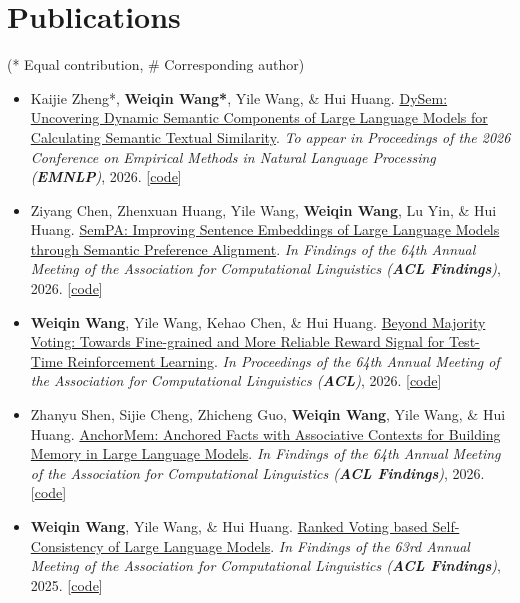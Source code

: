 \documentclass[a4paper,11pt]{article}
\newcommand{\resumeItemListStart}{\begin{itemize}[leftmargin=*,labelsep=1mm,itemsep=0.5mm]}
\newcommand{\resumeItemListEnd}{\end{itemize}\vspace{-2mm}}
\begin{document}
\section{\textbf{Publications}}
\vspace{-0.4mm}
\small{(* Equal contribution, \# Corresponding author)}
\vspace{0.5mm}
\resumeItemListStart
  \item Kaijie Zheng*, \textbf{Weiqin Wang*}, Yile Wang, \& Hui Huang. \href{https://arxiv.org/abs/2605.29751}{DySem: Uncovering Dynamic Semantic Components of Large Language Models for Calculating Semantic Textual Similarity}. \textit{To appear in Proceedings of the 2026 Conference on Empirical Methods in Natural Language Processing (\textbf{EMNLP})}, 2026. [\href{https://github.com/szu-tera/DySem}{code}]
  \item Ziyang Chen, Zhenxuan Huang, Yile Wang, \textbf{Weiqin Wang}, Lu Yin, \& Hui Huang. \href{https://aclanthology.org/2026.findings-acl.1858.pdf}{SemPA: Improving Sentence Embeddings of Large Language Models through Semantic Preference Alignment}. \textit{In Findings of the 64th Annual Meeting of the Association for Computational Linguistics (\textbf{ACL Findings})}, 2026. [\href{https://github.com/szu-tera/SemPA}{code}]
  \item \textbf{Weiqin Wang}, Yile Wang, Kehao Chen, \& Hui Huang. \href{https://aclanthology.org/2026.acl-long.1727.pdf}{Beyond Majority Voting: Towards Fine-grained and More Reliable Reward Signal for Test-Time Reinforcement Learning}. \textit{In Proceedings of the 64th Annual Meeting of the Association for Computational Linguistics (\textbf{ACL})}, 2026. [\href{https://github.com/szu-tera/SCOPE}{code}]
  \item Zhanyu Shen, Sijie Cheng, Zhicheng Guo, \textbf{Weiqin Wang}, Yile Wang, \& Hui Huang. \href{https://aclanthology.org/2026.findings-acl.1736.pdf}{AnchorMem: Anchored Facts with Associative Contexts for Building Memory in Large Language Models}. \textit{In Findings of the 64th Annual Meeting of the Association for Computational Linguistics (\textbf{ACL Findings})}, 2026. [\href{https://github.com/szu-tera/AnchorMem}{code}]
  \item \textbf{Weiqin Wang}, Yile Wang, \& Hui Huang. \href{https://aclanthology.org/2025.findings-acl.744/}{Ranked Voting based Self-Consistency of Large Language Models}. \textit{In Findings of the 63rd Annual Meeting of the Association for Computational Linguistics (\textbf{ACL Findings})}, 2025. [\href{https://github.com/szu-tera/RankedVotingSC}{code}]
\resumeItemListEnd
\end{document}
